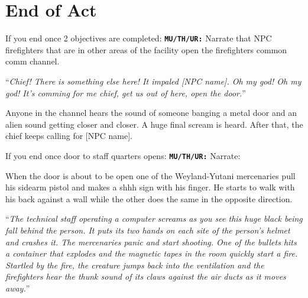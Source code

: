 \newsect

\section{End of Act}

\begin{rpg-commentbox}{If you end once 2 objectives are completed:}
    \texttt{\textbf{MU/TH/UR:}} Narrate that NPC firefighters that are in other areas of the facility open the firefighters common comm channel. 

    ``\textit{Chief! There is something else here! It impaled [NPC name]. Oh my god! Oh my god! It's comming for me chief, get us out of here, open the door.}''

    Anyone in the channel hears the sound of someone banging a metal door and an alien sound getting closer and closer. A huge final scream is heard. After that, the chief keeps calling for [NPC name].
\end{rpg-commentbox}



\begin{rpg-commentbox}{If you end once door to staff quarters opens:}
    \texttt{\textbf{MU/TH/UR:}} Narrate:

    When the door is about to be open one of the Weyland-Yutani mercenaries pull his sidearm pistol and makes a shhh sign with his finger. He starts to walk with his back against a wall while the other does the same in the opposite direction.
    
    ``\textit{The technical staff operating a computer screams as you see this huge black being fall behind the person. It puts its two hands on each site of the person's helmet and crashes it. The mercenaries panic and start shooting. One of the bullets hits a container that explodes and the magnetic tapes in the room quickly start a fire. Startled by the fire, the creature jumps back into the ventilation and the firefighters hear the thunk sound of its claws against the air ducts as it moves away.}''
\end{rpg-commentbox}